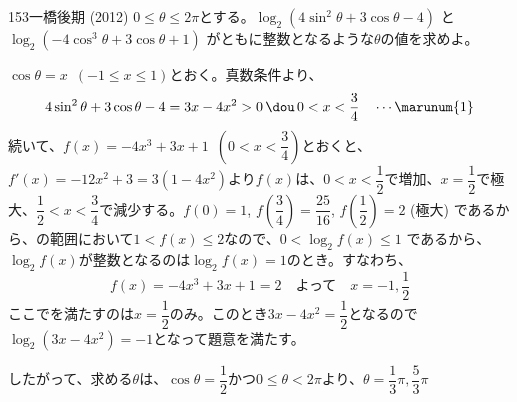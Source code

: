 \begin{prob}{153}{\maru}{一橋後期 (2012)}
 $0\le\theta\le 2\pi$とする。$\log_2 (4\sin^2\theta+3\cos\theta-4)$ と $\log_2 (-4\cos^3\theta+3\cos\theta+1)$ がともに整数となるような$\theta$の値を求めよ。
\end{prob}
$\cos\theta=x$~$(-1\le x\le 1)$とおく。真数条件より、
\[ 4\sin^2\theta+3\cos\theta-4=3x-4x^2 > 0 \,\dou\, 0<x<\frac{3}{4} \quad \cdots \marunum{1} \]
続いて、$f(x)=-4x^3+3x+1$~$(0<x<\dfrac{3}{4})$とおくと、$f'(x)=-12x^2+3=3(1-4x^2)$より$f(x)$は、$0<x<\dfrac{1}{2}$で増加、$x=\dfrac{1}{2}$で極大、$\dfrac{1}{2}<x<\dfrac{3}{4}$で減少する。$f(0)=1$, $f\left(\dfrac{3}{4}\right)=\dfrac{25}{16}$, $f\left(\dfrac{1}{2}\right)=2$ (極大) であるから、の範囲において$1<f(x)\le 2$なので、$0<\log_2{f(x)}\le 1$ であるから、$\log_2{f(x)}$が整数となるのは$\log_2{f(x)}=1$のとき。すなわち、
\[ f(x)=-4x^3+3x+1=2 \quad  \text{よって}\quad x=-1, \frac{1}{2} \]
ここでを満たすのは$x=\dfrac{1}{2}$のみ。このとき$3x-4x^2=\dfrac{1}{2}$となるので$\log_2{(3x-4x^2)}=-1$となって題意を満たす。

したがって、求める$\theta$は、$\cos\theta=\dfrac{1}{2}$かつ$0\le \theta < 2\pi$より、$\theta=\dfrac{1}{3}\pi, \dfrac{5}{3}\pi$